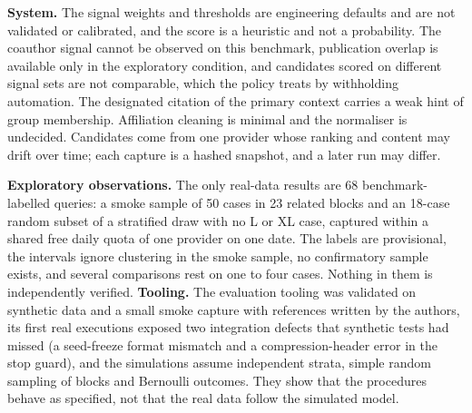 \textbf{System.} The signal weights and thresholds are engineering defaults and are not validated or calibrated, and the score is a heuristic and not a probability. The coauthor signal cannot be observed on this benchmark, publication overlap is available only in the exploratory condition, and candidates scored on different signal sets are not comparable, which the policy treats by withholding automation. The designated citation of the primary context carries a weak hint of group membership. Affiliation cleaning is minimal and the normaliser is undecided. Candidates come from one provider whose ranking and content may drift over time; each capture is a hashed snapshot, and a later run may differ.

\textbf{Exploratory observations.} The only real-data results are 68 benchmark-labelled queries: a smoke sample of 50 cases in 23 related blocks and an 18-case random subset of a stratified draw with no L or XL case, captured within a shared free daily quota of one provider on one date. The labels are provisional, the intervals ignore clustering in the smoke sample, no confirmatory sample exists, and several comparisons rest on one to four cases. Nothing in them is independently verified. \textbf{Tooling.} The evaluation tooling was validated on synthetic data and a small smoke capture with references written by the authors, its first real executions exposed two integration defects that synthetic tests had missed (a seed-freeze format mismatch and a compression-header error in the stop guard), and the simulations assume independent strata, simple random sampling of blocks and Bernoulli outcomes. They show that the procedures behave as specified, not that the real data follow the simulated model.
